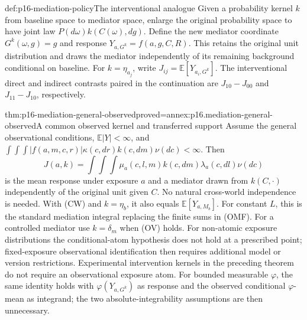 \begin{hbdefinition}{def:p16-mediation-policy}{The interventional analogue}
Given a probability kernel \(k\) from baseline space to mediator space,
enlarge the original probability space to have joint law
\(P(d\omega)k(C(\omega),dg)\). Define the new mediator coordinate
\(G^k(\omega,g)=g\) and response \(Y_{a,G^k}=f(a,g,C,R)\).
This retains the original unit distribution and draws the mediator
independently of its remaining background conditional on baseline.
For \(k=\eta_{a_j}\), write \(J_{ij}=\mathbb E[Y_{a_i,G^k}]\).
The interventional direct and indirect contrasts paired in the continuation
are \(J_{10}-J_{00}\) and \(J_{11}-J_{10}\), respectively.
\end{hbdefinition}

\begin{hbtheorem}{thm:p16-mediation-general-observed}{proved=annex:p16.mediation-general-observed}{A common observed kernel and transferred support}
Assume the general observational conditions, \(\mathbb E|Y|<\infty\), and
\(\int\!\int\!\int |f(a,m,c,r)|\kappa(c,dr)k(c,dm)\nu(dc)<\infty\).
Then
\[
 J(a,k)=\int\!\int\!\int
                  \mu_a(c,l,m)k(c,dm)\lambda_a(c,dl)\nu(dc) \tag{IGF}
\]
is the mean response under exposure \(a\) and a mediator drawn from
\(k(C,\cdot)\) independently of the original unit given \(C\).
No natural cross-world independence is needed. With (CW) and
\(k=\eta_b\), it also equals \(\mathbb E[Y_{a,M_b}]\).
For constant \(L\), this is the standard mediation integral replacing
the finite sums in (OMF). For a controlled mediator use \(k=\delta_m\)
when (OV) holds. For non-atomic exposure distributions the conditional-atom
hypothesis does not hold at a prescribed point; fixed-exposure observational
identification then requires additional model or version restrictions.
Experimental intervention kernels in the preceding theorem do not require
an observational exposure atom.
For bounded measurable \(\varphi\), the same identity holds with
\(\varphi(Y_{a,G^k})\) as response and the observed conditional
\(\varphi\)-mean as integrand; the two absolute-integrability assumptions
are then unnecessary.
\end{hbtheorem}

